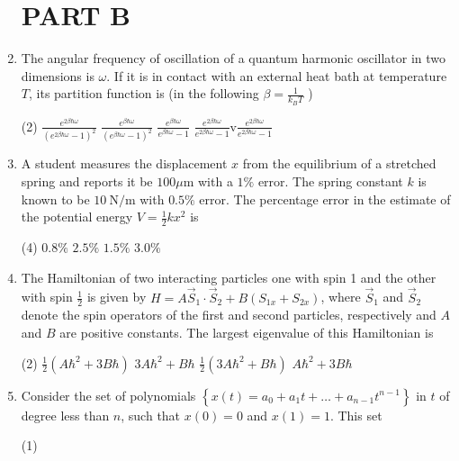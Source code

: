 \begin{enumerate}
\section{PART B}
\item The angular frequency of oscillation of a quantum harmonic oscillator in two dimensions is $\omega$. If it is in contact with an external heat bath at temperature $T$, its partition function is (in the following $\beta=\frac{1}{k_{B} T}$ )
 \begin{tasks}(2)
	\task[\textbf{a.}]$\frac{e^{2 \beta \hbar \omega}}{\left(e^{2 \beta \hbar \omega}-1\right)^{2}}$
	\task[\textbf{b.}]$\frac{e^{\beta \hbar \omega}}{\left(e^{\beta \hbar \omega}-1\right)^{2}}$
	\task[\textbf{c.}]$\frac{e^{\beta \hbar \omega}}{e^{\beta \hbar \omega}-1}$
	\task[\textbf{d.}] $\frac{e^{2 \beta \hbar \omega}}{e^{2 \beta \hbar \omega}-1}$v$\frac{e^{2 \beta \hbar \omega}}{e^{2 \beta \hbar \omega}-1}$
\end{tasks}
\item A student measures the displacement $x$ from the equilibrium of a stretched spring and reports it be $100 \mu \mathrm{m}$ with a $1 \%$ error. The spring constant $k$ is known to be $10 \mathrm{~N} / \mathrm{m}$ with $0.5 \%$ error. The percentage error in the estimate of the potential energy $V=\frac{1}{2} k x^{2}$ is
 \begin{tasks}(4)
	\task[\textbf{a.}]$0.8 \%$
	\task[\textbf{b.}] $2.5 \%$
	\task[\textbf{c.}] $1.5 \%$
	\task[\textbf{d.}] $3.0 \%$ 
\end{tasks}
\item The Hamiltonian of two interacting particles one with spin 1 and the other with spin $\frac{1}{2}$ is given by $H=A \vec{S}_{1} \cdot \vec{S}_{2}+B\left(S_{1 x}+S_{2 x}\right)$, where $\vec{S}_{1}$ and $\vec{S}_{2}$ denote the spin operators of the first and second particles, respectively and $A$ and $B$ are positive constants. The largest eigenvalue of this Hamiltonian is
 \begin{tasks}(2)
	\task[\textbf{a.}] $\frac{1}{2}\left(A \hbar^{2}+3 B \hbar\right)$
	\task[\textbf{b.}]$3 A \hbar^{2}+B \hbar$
	\task[\textbf{c.}] $\frac{1}{2}\left(3 A \hbar^{2}+B \hbar\right)$
	\task[\textbf{d.}]  $A \hbar^{2}+3 B \hbar$	
\end{tasks}
\item  Consider the set of polynomials $\left\{x(t)=a_{0}+a_{1} t+\ldots+a_{n-1} t^{n-1}\right\}$ in $t$ of degree less than $n$, such that $x(0)=0$ and $x(1)=1$. This set
 \begin{tasks}(1)

\end{tasks}
\end{enumerate}
